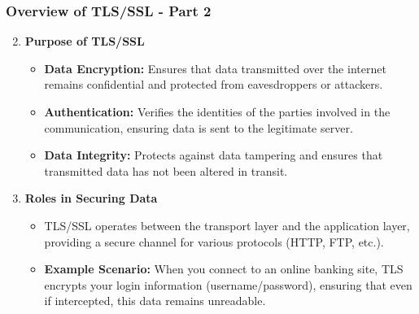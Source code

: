 \documentclass{beamer}
\begin{document}
\begin{frame}[fragile]
    \frametitle{Overview of TLS/SSL - Part 2}
    \begin{enumerate}
        \setcounter{enumi}{1} %
        \item \textbf{Purpose of TLS/SSL}
            \begin{itemize}
                \item \textbf{Data Encryption:} Ensures that data transmitted over the internet remains confidential and protected from eavesdroppers or attackers. 
                \item \textbf{Authentication:} Verifies the identities of the parties involved in the communication, ensuring data is sent to the legitimate server.
                \item \textbf{Data Integrity:} Protects against data tampering and ensures that transmitted data has not been altered in transit.
            \end{itemize}

        \item \textbf{Roles in Securing Data}
            \begin{itemize}
                \item TLS/SSL operates between the transport layer and the application layer, providing a secure channel for various protocols (HTTP, FTP, etc.).
                \item \textbf{Example Scenario:} When you connect to an online banking site, TLS encrypts your login information (username/password), ensuring that even if intercepted, this data remains unreadable.
            \end{itemize}
    \end{enumerate}
\end{frame}
\end{document}
